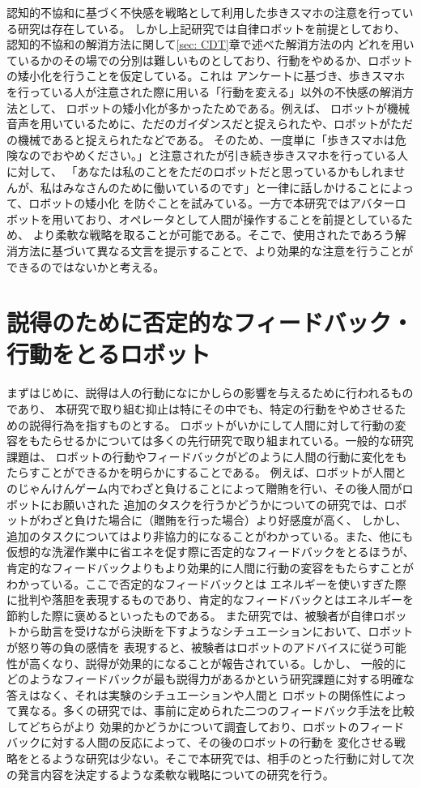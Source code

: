 \documentclass{kuisthesis}
\begin{document}
認知的不協和に基づく不快感を戦略として利用した歩きスマホの注意を行っている研究は存在している\cite{Schneider2022}。
しかし上記研究では自律ロボットを前提としており、認知的不協和の解消方法に関して\ref{sec: CDT}章で述べた解消方法の内
どれを用いているかのその場での分別は難しいものとしており、行動をやめるか、ロボットの矮小化を行うことを仮定している。これは
アンケートに基づき、歩きスマホを行っている人が注意された際に用いる「行動を変える」以外の不快感の解消方法として、
ロボットの矮小化が多かったためである。例えば、
ロボットが機械音声を用いているために、ただのガイダンスだと捉えられたや、ロボットがただの機械であると捉えられたなどである。
そのため、一度単に「歩きスマホは危険なのでおやめください。」と注意されたが引き続き歩きスマホを行っている人に対して、
「あなたは私のことをただのロボットだと思っているかもしれませんが、私はみなさんのために働いているのです」と一律に話しかけることによって、ロボットの矮小化
を防ぐことを試みている。一方で本研究ではアバターロボットを用いており、オペレータとして人間が操作することを前提としているため、
より柔軟な戦略を取ることが可能である。そこで、使用されたであろう解消方法に基づいて異なる文言を提示することで、より効果的な注意を行うことができるのではないかと考える。

\section{説得のために否定的なフィードバック・行動をとるロボット}
まずはじめに、説得は人の行動になにかしらの影響を与えるために行われるものであり、
本研究で取り組む抑止は特にその中でも、特定の行動をやめさせるための説得行為を指すものとする。
ロボットがいかにして人間に対して行動の変容をもたらせるかについては多くの先行研究で取り組まれている。一般的な研究課題は、
ロボットの行動やフィードバックがどのように人間の行動に変化をもたらすことができるかを明らかにすることである。
例えば、ロボットが人間とのじゃんけんゲーム内でわざと負けることによって贈賄を行い、その後人間がロボットにお願いされた
追加のタスクを行うかどうかについての研究\cite{sandoval2016can}では、ロボットがわざと負けた場合に（贈賄を行った場合）より好感度が高く、
しかし、追加のタスクについてはより非協力的になることがわかっている。また、他にも仮想的な洗濯作業中に省エネを促す際に否定的なフィードバックをとるほうが、
肯定的なフィードバックよりもより効果的に人間に行動の変容をもたらすことがわかっている\cite{Midden2009}。ここで否定的なフィードバックとは
エネルギーを使いすぎた際に批判や落胆を表現するものであり、肯定的なフィードバックとはエネルギーを節約した際に褒めるといったものである。
また研究\cite{paradeda2019makes}では、被験者が自律ロボットから助言を受けながら決断を下すようなシチュエーションにおいて、ロボットが怒り等の負の感情を
表現すると、被験者はロボットのアドバイスに従う可能性が高くなり、説得が効果的になることが報告されている。しかし、
一般的にどのようなフィードバックが最も説得力があるかという研究課題に対する明確な答えはなく、それは実験のシチュエーションや人間と
ロボットの関係性によって異なる。多くの研究では、事前に定められた二つのフィードバック手法を比較してどちらがより
効果的かどうかについて調査しており、ロボットのフィードバックに対する人間の反応によって、その後のロボットの行動を
変化させる戦略をとるような研究は少ない。そこで本研究では、相手のとった行動に対して次の発言内容を決定するような柔軟な戦略についての研究を行う。
\end{document}
